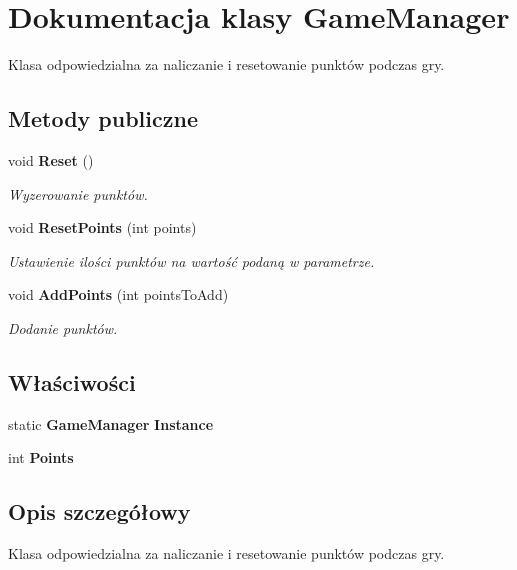 \section{Dokumentacja klasy Game\+Manager}
\label{class_game_manager}


Klasa odpowiedzialna za naliczanie i resetowanie punktów podczas gry.  


\subsection*{Metody publiczne}
\begin{DoxyCompactItemize}
\item 
void {\bf Reset} ()
\begin{DoxyCompactList}\small\item\em Wyzerowanie punktów. \end{DoxyCompactList}\item 
void {\bf Reset\+Points} (int points)
\begin{DoxyCompactList}\small\item\em Ustawienie ilości punktów na wartość podaną w parametrze. \end{DoxyCompactList}\item 
void {\bf Add\+Points} (int points\+To\+Add)
\begin{DoxyCompactList}\small\item\em Dodanie punktów. \end{DoxyCompactList}\end{DoxyCompactItemize}
\subsection*{Właściwości}
\begin{DoxyCompactItemize}
\item 
static {\bf Game\+Manager} {\bfseries Instance}\hspace{0.3cm}{\ttfamily  [get]}\label{class_game_manager_ad3e717f4fb0f378b969f4457de81f23e}

\item 
int {\bfseries Points}\hspace{0.3cm}{\ttfamily  [get]}\label{class_game_manager_ad6b14d4dcf3b37f9e3c626bb4fff6755}

\end{DoxyCompactItemize}


\subsection{Opis szczegółowy}
Klasa odpowiedzialna za naliczanie i resetowanie punktów podczas gry. 



